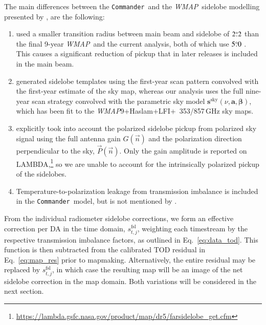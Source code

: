 \documentclass[twocolumn]{aa}
\def\WMAP{\emph{WMAP}}
\def\commander{\texttt{Commander}}
\begin{document}
The main differences between the \commander\ and
the \WMAP\ sidelobe modelling presented by \citet{barnes2003}, are
the following:
\begin{enumerate}
	\item \citet{barnes2003} used a smaller transition radius between
		main beam and sidelobe of $2\overset{\circ}{.}2$ than the final
                9-year \WMAP\ and the current analysis, both of which use
		$5\overset{\circ}{.}0$ \citep{hill2009,bennett2012}. This causes a significant
		reduction of pickup that in later releases is included in the
		main beam. 
	\item \citet{barnes2003} generated sidelobe templates using the
		first-year scan pattern convolved with the first-year estimate
		of the sky map, whereas our analysis uses the full nine-year
		scan strategy convolved with the parametric sky model
		$\boldsymbol s^\mathrm{sky}(\nu,\boldsymbol
		a,\boldsymbol\beta)$, which has been  fit to the
		\WMAP9+Haslam+LFI+\Planck\ 353/857\,GHz sky maps. 
	\item \citet{barnes2003} explicitly took into account the polarized
		sidelobe pickup from polarized sky signal using the full
		antenna gain $G(\vec n)$ and the polarization direction
		perpendicular to the sky, $\vec P(\vec n)$. Only the gain
		amplitude is reported on
		LAMBDA,\footnote{\url{https://lambda.gsfc.nasa.gov/product/map/dr5/farsidelobe_get.cfm}}
		so we are unable to account for the intrinsically polarized pickup of the
		sidelobes. 
        \item Temperature-to-polarization leakage from transmission
          imbalance is included in the \commander\ model, but is
          not mentioned by \citet{barnes2003}.
\end{enumerate}



From the individual radiometer sidelobe corrections, we form an effective
correction per DA in the time domain, $s_{t,j}^\mathrm{fsl}$, weighting each
timestream by the respective transmission imbalance factors, as outlined in
Eq.~\eqref{eq:data_tod}. This function is then subtracted from the calibrated
TOD residual in Eq.~\eqref{eq:map_res} prior to mapmaking. Alternatively, the
entire residual may be replaced by $s_{t,j}^\mathrm{fsl}$, in which case the
resulting map will be an image of the net sidelobe correction in the map
domain. Both variations will be considered in the next section.
\end{document}
